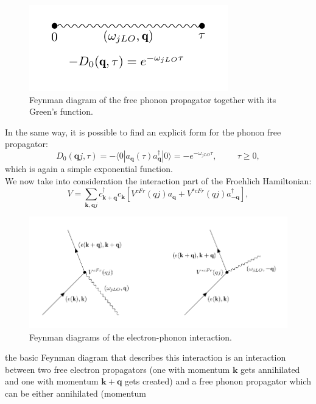 \begin{figure}[H]
    \centering
    \includegraphics[scale=1]{free_ph_propagator.pdf}
    \caption{Feynman diagram of the free phonon propagator together with its Green's function.}
    \label{fig:ph_prop_free}
\end{figure}
In the same way, it is possible to find an explicit form for the phonon free propagator:
\begin{equation}
    D_0(\mathbf{q}j,\tau)=-\langle 0|a_\mathbf{q}(\tau)a^\dagger_\mathbf{q}|0\rangle=-e^{-\omega_{jLO}\tau},\hspace{1cm}\tau\ge0,
\end{equation}
which is again a simple exponential function.\\
We now take into consideration the interaction part of the Froehlich Hamiltonian:
\begin{equation}
    V=\sum_{\mathbf{k},\mathbf{q}j}c^\dagger_{\mathbf{k+q}}c_{\mathbf{k}}\left[V^{cFr}(qj)a_\mathbf{q}+V^{*cFr}(qj)a^\dagger_\mathbf{-q}\right],
    \label{polaron_interacting}
\end{equation}
\begin{figure}[H]
    \centering
    \includegraphics[scale=1.0]{interaction_vertex.pdf}
    \caption{Feynman diagrams of the electron-phonon interaction.}
    \label{fig:interaction_vertex}
\end{figure}
the basic Feynman diagram that describes this interaction is an interaction between two free electron propagators (one with momentum 
$\mathbf{k}$ gets annihilated and one with momentum $\mathbf{k+q}$ gets created) and a free phonon propagator which can be either annihilated (momentum 
